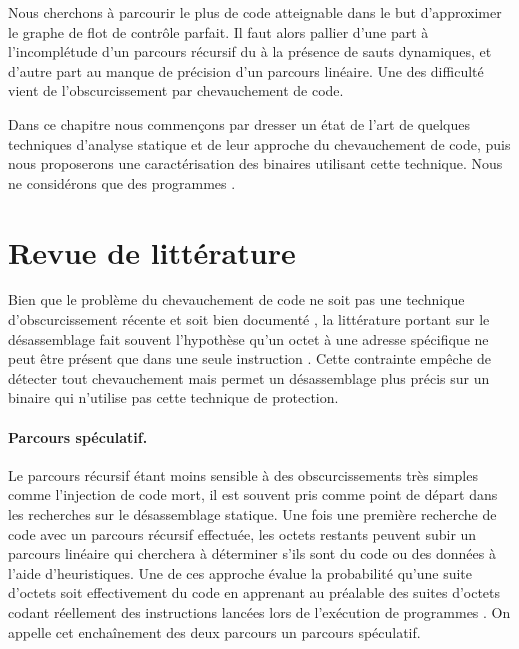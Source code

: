 Nous cherchons à parcourir le plus de code atteignable dans le but d'approximer le graphe de flot de contrôle parfait.
Il faut alors pallier d'une part à l'incomplétude d'un parcours récursif du à la présence de sauts dynamiques, et d'autre part au manque de précision d'un parcours linéaire.
Une des difficulté vient de l'obscurcissement par chevauchement de code. 

Dans ce chapitre nous commençons par dresser un état de l'art de quelques techniques d'analyse statique et de leur approche du chevauchement de code, puis nous proposerons une caractérisation des binaires utilisant cette technique.
Nous ne considérons que des programmes \nsms.


\section{Revue de littérature}
Bien que le problème du chevauchement de code ne soit pas une technique d'obscurcissement récente et soit bien documenté \cite{PMA}, la littérature portant sur le désassemblage fait souvent l'hypothèse qu'un octet à une adresse spécifique ne peut être présent que dans une seule instruction \cite{KruegelRVV04}. 
Cette contrainte empêche de détecter tout chevauchement mais permet un désassemblage plus précis sur un binaire qui n'utilise pas cette technique de protection.


\paragraph{Parcours spéculatif.}
Le parcours récursif étant moins sensible à des obscurcissements très simples comme l'injection de code mort, il est souvent pris comme point de départ dans les recherches sur le désassemblage statique.
Une fois une première recherche de code avec un parcours récursif effectuée, les octets restants peuvent subir un parcours linéaire qui cherchera à déterminer s'ils sont du code ou des données à l'aide d'heuristiques.
Une de ces approche évalue la probabilité qu'une suite d'octets soit effectivement du code en apprenant au préalable des suites d'octets codant réellement des instructions lancées lors de l'exécution de programmes \cite{KDF09}.
On appelle cet enchaînement des deux parcours un parcours spéculatif.

